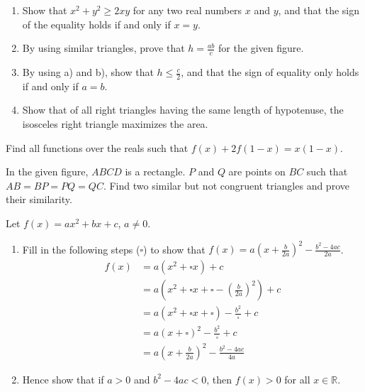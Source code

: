 \begin{problems}
    \problem 
    \begin{enumerate}
        \item Show that $x^2 + y^2 \geq 2xy$ for any two real numbers $x$ and
            $y$, and that the sign of the equality holds if and only if $x=y$. 
        
        \item By using similar triangles, prove that $h = \frac{ab}{c}$ for the
            given figure.
        
        \item By using a) and b), show that $h \leq \frac{c}{2}$, and that the
            sign of equality only holds if and only if $a = b$. 
        
        \item Show that of all right triangles having the same length of
            hypotenuse, the isosceles right triangle maximizes the area. 
    \end{enumerate}

    \problem Find all functions over the reals such that $f(x) + 2f(1 - x) =
    x(1 - x)$.
    
    \problem In the given figure, $ABCD$ is a rectangle. $P$ and $Q$ are points
    on $BC$ such that $AB = BP = PQ = QC$. Find two similar but not congruent
    triangles and prove their similarity. 
    
    \problem Let $f(x) = ax^2 + bx + c$, $a \ne 0$. 
    \begin{enumerate}
        \item Fill in the following steps ($\square$) to show that $f(x) = a(x
            + \frac{b}{2a})^2 - \frac{b^2 - 4ac}{2a}$. 
        \begin{align*}
            f(x) &= a(x^2 + \square x) + c\\
            &= a\left(x^2 + \square x + \square - \left(\frac{b}{2a}\right)^2\right) + c\\
            &= a(x^2 + \square x + \square)- \frac{b^2}{\square} + c\\
            &= a(x + \square)^2 - \frac{b^2}{\square} + c\\
            &= a\left(x + \frac{b}{2a}\right)^2 - \frac{b^2 - 4ac}{4a}
        \end{align*}
        
        \item Hence show that if $a > 0$ and $b^2 - 4ac < 0$, then $f(x) > 0$
            for all $x \in \mathbb{R}$. 
        

\end{enumerate}
\end{problems}
